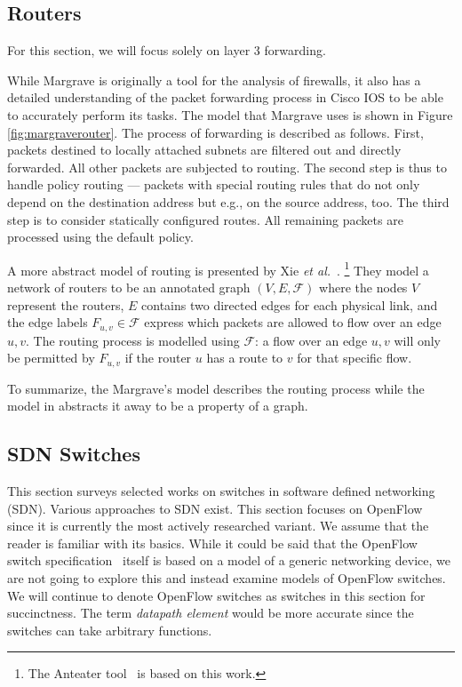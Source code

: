 \subsection{Routers}\label{sec:rtr}

For this section, we will focus solely on layer 3 forwarding.

While Margrave \cite{nelson2010margrave} is originally a tool for the analysis of firewalls, it also has a detailed understanding of the packet forwarding process in Cisco IOS to be able to accurately perform its tasks.
The model that Margrave uses is shown in Figure \ref{fig:margraverouter}.
The process of forwarding is described as follows.
First, packets destined to locally attached subnets are filtered out and directly forwarded.
All other packets are subjected to routing.
The second step is thus to handle policy routing --- packets with special routing rules that do not only depend on the destination address but e.g., on the source address, too.
The third step is to consider statically configured routes.
All remaining packets are processed using the default policy.

A more abstract model of routing is presented by Xie \emph{et al.}~\cite{xie2005static}.%
\footnote{The Anteater tool~\cite{mai2011debugging} is based on this work.}
They model a network of routers to be an annotated graph $(V,E,\mathcal{F})$ where the nodes $V$ represent the routers, $E$ contains two directed edges for each physical link, and the edge labels $F_{u,v} \in \mathcal{F}$ express which packets are allowed to flow over an edge $u,v$.
The routing process is modelled using $\mathcal{F}$:
a flow over an edge $u,v$ will only be permitted by $F_{u,v}$ if the router $u$ has a route to $v$ for that specific flow.

To summarize, the Margrave's model \cite{nelson2010margrave} describes the routing process while the model in \cite{xie2005static} abstracts it away to be a property of a graph.

\subsection{SDN Switches}\label{sec:sdn}
This section surveys selected works on switches in software defined networking (SDN).
Various approaches to SDN exist.
This section focuses on OpenFlow~\cite{mckeown2008openflow} since it is currently the most actively researched variant.
We assume that the reader is familiar with its basics.
While it could be said that the OpenFlow switch specification~\cite{specification15} itself is based on a model of a generic networking device, we are not going to explore this and instead examine models of OpenFlow switches.
We will continue to denote OpenFlow switches as switches in this section for succinctness.
The term \emph{datapath element} would be more accurate since the switches can take arbitrary functions.

